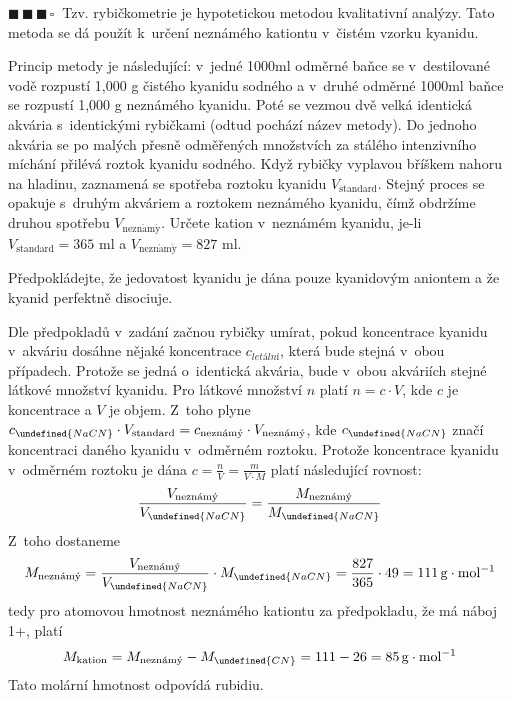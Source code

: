 \documentclass{book}
\let\ch\undefined
\newcommand{\tri}{$\blacksquare \, \blacksquare \, \blacksquare \, \square \; \; $}
\renewenvironment{quotation}{\par}{\par} %
\begin{document}
\hrulefill %
\begin{quotation}
\tri Tzv. rybičkometrie je hypotetickou metodou kvalitativní analýzy. Tato
metoda se dá použít k~určení neznámého kationtu v~čistém vzorku
kyanidu.

Princip metody je následující: v~jedné 1000ml odměrné baňce se v~destilované
vodě rozpustí 1,000 g čistého kyanidu sodného a v~druhé odměrné 1000ml
baňce se rozpustí 1,000 g neznámého kyanidu. Poté se vezmou dvě velká
identická akvária s~identickými rybičkami (odtud pochází název metody).
Do jednoho akvária se po malých přesně odměřených množstvích za
stálého intenzivního míchání přilévá roztok kyanidu sodného. Když
rybičky vyplavou bříškem nahoru na hladinu, zaznamená se spotřeba
roztoku kyanidu $V_{\mathrm{standard}}$. Stejný proces se opakuje
s~druhým akváriem a roztokem neznámého kyanidu, čímž obdržíme druhou
spotřebu $V_{\mathrm{nezn\acute{a}m\acute{y}}}$. Určete kation v~neznámém
kyanidu, je-li $V_{\mathrm{standard}}=365$ ml a $V_{\mathrm{nezn\acute{a}m\acute{y}}}=827$
ml.

Předpokládejte, že jedovatost kyanidu je dána pouze kyanidovým aniontem
a že kyanid perfektně disociuje.
\end{quotation} \dotfill \par 
Dle předpokladů v~zadání začnou rybičky umírat, pokud koncentrace
kyanidu v~akváriu dosáhne nějaké koncentrace $c_{letální}$, která
bude stejná v~obou případech. Protože se jedná o~identická akvária,
bude v~obou akváriích stejné látkové množství kyanidu. Pro látkové
množství $n$ platí $n=c\cdot V$, kde $c$ je koncentrace a $V$
je objem. Z~toho plyne $c_{\ch{NaCN}}\cdot V_{\mathrm{standard}}=c_{\mathrm{nezn\acute{a}m\acute{y}}}\cdot V_{\mathrm{nezn\acute{a}m\acute{y}}}$,
kde $c_{\ch{NaCN}}$ značí koncentraci daného kyanidu v~odměrném
roztoku. Protože koncentrace kyanidu v~odměrném roztoku je dána $c=\frac{n}{V}=\frac{m}{V\cdot M}$
platí následující rovnost: 
\[
\frac{V_{\mathrm{nezn\acute{a}m\acute{y}}}}{V_{\ch{NaCN}}}=\frac{M_{\mathrm{nezn\acute{a}m\acute{y}}}}{M_{\ch{NaCN}}}
\]
Z~toho dostaneme 
\[
M_{\mathrm{nezn\acute{a}m\acute{y}}}=\frac{V_{\mathrm{nezn\acute{a}m\acute{y}}}}{V_{\ch{NaCN}}}\cdot M_{\ch{NaCN}}=\frac{827}{365}\cdot49=111\,\mathrm{g\cdot mol^{-1}}
\]
tedy pro atomovou hmotnost neznámého kationtu za předpokladu, že má
náboj 1+, platí 
\[
M_{\mathrm{kation}}=M_{\mathrm{nezn\acute{a}m\acute{y}}}-M_{\ch{CN}}=111-26=85\,\mathrm{g\cdot mol^{-1}}
\]
Tato molární hmotnost odpovídá rubidiu.
\end{document}
